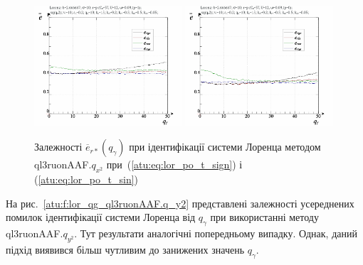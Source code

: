 \begin{figure}[ht!]
  \centerline{
    \includegraphics[width=0.49\textwidth]{p/cha/lor/ql3ruonAAF/lor_ql3ruonAAF_qx2-p_qgamma_e_sign.png}
    \hfill
    \includegraphics[width=0.49\textwidth]{p/cha/lor/ql3ruonAAF/lor_ql3ruonAAF_qx2-p_qgamma_e_sin.png}
  }
\caption{Залежності $ \overline{e}_{r *} (q_\gamma) $ при ідентифікації системи Лоренца методом ql3ruonAAF.$q_{x^2} $ при~(\ref{atu:eq:lor_po_t_sign}) і (\ref{atu:eq:lor_po_t_sin})}
\label{atu:f:lor_qg_ql3ruonAAF.q_x2}
\end{figure}



На рис.~\ref{atu:f:lor_qg_ql3ruonAAF.q_y2} представлені залежності усереднених
помилок ідентифікації системи Лоренца від
$ q_\gamma $ при використанні методу
ql3ruonAAF.$q_{y^2}$.
Тут результати аналогічні попередньому випадку. Однак, даний
підхід виявився більш чутливим до занижених значень $ q_\gamma $.

